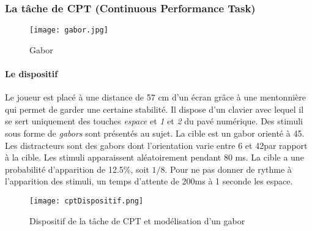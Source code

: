 \subsubsection{La tâche de CPT (Continuous Performance Task)}

\begin{wrapfigure}[7]{l}{2.3cm}
\vspace{-15pt}
\texttt{[image: gabor.jpg]}
\captionsetup{labelformat=simpleNumber}
\caption{Gabor}
\end{wrapfigure}

\paragraph{Le dispositif}Le joueur est placé à une distance de 57 cm d'un écran grâce à une mentonnière qui permet de garder une certaine stabilité. Il dispose d'un clavier avec
lequel il se sert uniquement des touches \emph{espace} et \emph{1} et \emph{2} du pavé numérique. Des stimuli sous forme de \emph{\glspl{gabor}} sont présentés au sujet. La cible est un gabor
orienté à 45\degre. Les distracteurs sont des gabors dont l'orientation varie entre 6 et 42\degre par rapport à la cible. Les stimuli apparaissent aléatoirement pendant 80 ms. La
cible a une probabilité d'apparition de 12.5\%, soit $1/8$. Pour ne pas donner de rythme à l'apparition des stimuli, un temps d'attente de 200ms à 1 seconde les espace.

\begin{figure}[H]
    \begin{center}
    \texttt{[image: cptDispositif.png]}
    \end{center}
    \caption{Dispositif de la tâche de CPT et modélisation d'un gabor}
\label{CptDispositif}
\end{figure}

\newpage
